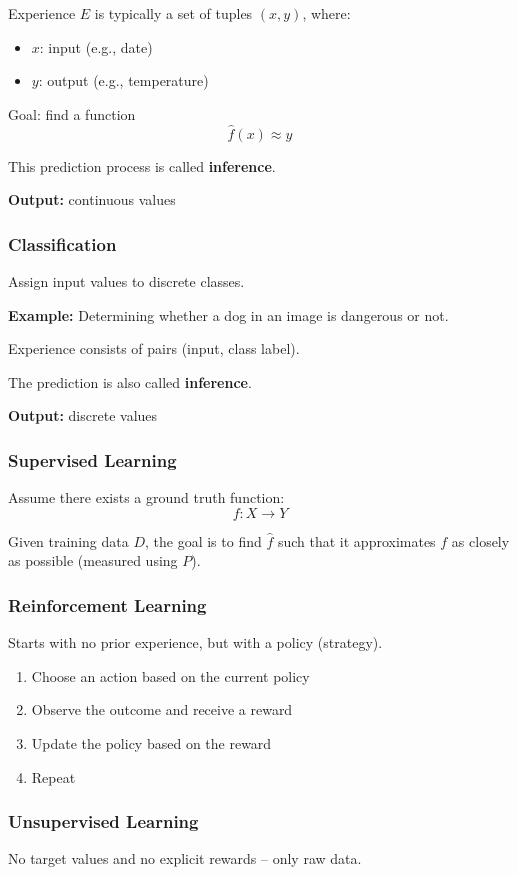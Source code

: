 \documentclass{article}
\begin{document}
Experience $E$ is typically a set of tuples $(x, y)$, where:
\begin{itemize}
  \item $x$: input (e.g., date)
  \item $y$: output (e.g., temperature)
\end{itemize}

Goal: find a function
\[
\hat{f}(x) \approx y
\]

This prediction process is called \textbf{inference}.

\textbf{Output:} continuous values

\subsubsection{Classification}
Assign input values to discrete classes.

\textbf{Example:} Determining whether a dog in an image is dangerous or not.

Experience consists of pairs (input, class label).

The prediction is also called \textbf{inference}.

\textbf{Output:} discrete values

\subsubsection{Supervised Learning}
Assume there exists a ground truth function:
\[
f : X \to Y
\]

Given training data $D$, the goal is to find $\hat{f}$ such that it approximates $f$ as closely as possible (measured using $P$).

\subsubsection{Reinforcement Learning}
Starts with no prior experience, but with a policy (strategy).

\begin{enumerate}
  \item Choose an action based on the current policy
  \item Observe the outcome and receive a reward
  \item Update the policy based on the reward
  \item Repeat
\end{enumerate}

\subsubsection{Unsupervised Learning}
No target values and no explicit rewards -- only raw data.
\end{document}
